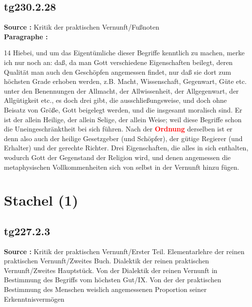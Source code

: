\documentclass[a4paper,12pt,twoside]{book}
\newcommand{\match}[1]{\textcolor{red}{\textbf{#1}}}
\newcommand{\unnumberedsection}[1]{
	\section*{#1}
	\addcontentsline{toc}{section}{#1}
	\markright{#1}
}
\begin{document}
	\subsection*{tg230.2.28} 
	\textbf{Source : }Kritik der praktischen Vernunft/Fußnoten\\  
	
	\noindent\textbf{Paragraphe : }
	
	14 Hiebei, und um das Eigentümliche dieser Begriffe kenntlich zu machen, merke ich nur noch an: daß, da man Gott verschiedene Eigenschaften beilegt, deren Qualität man auch den Geschöpfen angemessen findet, nur daß sie dort zum höchsten Grade erhoben werden, z.B. Macht, Wissenschaft, Gegenwart, Güte etc. unter den Benennungen der Allmacht, der Allwissenheit, der Allgegenwart, der Allgütigkeit etc., es doch drei gibt, die ausschließungsweise, und doch ohne Beisatz von Größe, Gott beigelegt werden, und die insgesamt moralisch sind. Er ist der allein Heilige, der allein Selige, der allein Weise; weil diese Begriffe schon die Uneingeschränktheit bei sich führen. Nach der \match{Ordnung} derselben ist er denn also auch der heilige Gesetzgeber (und Schöpfer), der gütige Regierer (und Erhalter) und der gerechte Richter. Drei Eigenschaften, die alles in sich enthalten, wodurch Gott der Gegenstand der Religion wird, und denen angemessen die metaphysischen Vollkommenheiten sich von selbst in der Vernunft hinzu fügen. 
	
	\unnumberedsection{Stachel (1)} 
	\subsection*{tg227.2.3} 
	\textbf{Source : }Kritik der praktischen Vernunft/Erster Teil. Elementarlehre der reinen praktischen Vernunft/Zweites Buch. Dialektik der reinen praktischen Vernunft/Zweites Hauptstück. Von der Dialektik der reinen Vernunft in Bestimmung des Begriffs vom höchsten Gut/IX. Von der der praktischen Bestimmung des Menschen weislich angemessenen Proportion seiner Erkenntnisvermögen\\  
	
\end{document}
